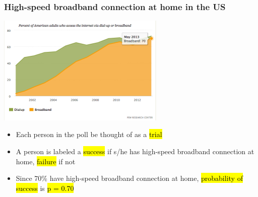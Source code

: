 \documentclass[slidestop,compress,mathserif,12pt,t,professionalfonts,xcolor=table]{beamer}
\begin{document}

\begin{frame}
\frametitle{High-speed broadband connection at home in the US}

\begin{center}
\includegraphics[width=0.6\textwidth]{figures/pew_internet_access}
\end{center}

\pause

\begin{itemize}
\item Each person in the poll be thought of as a \hl{trial}
\pause
\item A person is labeled a \hl{success} if s/he has high-speed broadband connection at home, \hl{failure} if not
\pause
\item Since 70\% have high-speed broadband connection at home, \hl{probability of success} is \hl{p = 0.70}
\end{itemize}

\end{frame}



\end{document}
